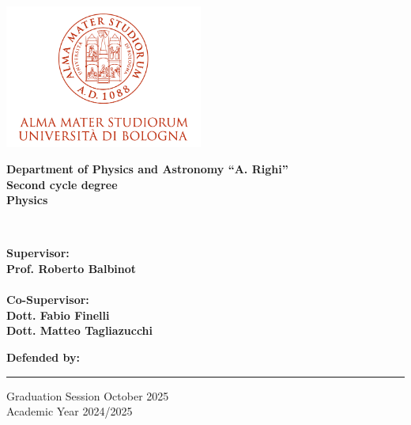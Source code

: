 \begin{titlepage}
    \begin{center}
        \includegraphics[width=65mm]{logo_unibo.png}
        \vspace{7mm}
        
        {{\bf Department of Physics and Astronomy “A. Righi”\\\vspace{4mm}
        Second cycle degree \\\vspace{7mm}
        \large Physics}}
        \end{center}
        \vspace{23mm}
        \begin{center}
        {\LARGE{\bf \Title}}\\
        \end{center}
        \vspace{50mm} \par \noindent
        \begin{minipage}[t]{0.47\textwidth}
        {\large{\bf Supervisor: \vspace{2mm}\\
        Prof. Roberto Balbinot}\\\\
        \bf Co-Supervisor:
        \vspace{2mm}\\
        Dott. Fabio Finelli\\
        Dott. Matteo Tagliazucchi
        \\}
        \end{minipage}
        \hfill
        \begin{minipage}[t]{0.47\textwidth}\raggedleft 
        {\large{\bf Defended by:
        \vspace{2mm}\\
        \Author   }}
        \end{minipage}
        \vspace{30mm}
        \begin{center}
        \rule[0.5cm]{15.8cm}{0.6mm}
        Graduation Session October 2025\\
        Academic Year 2024/2025 
        \end{center}
    \end{titlepage}